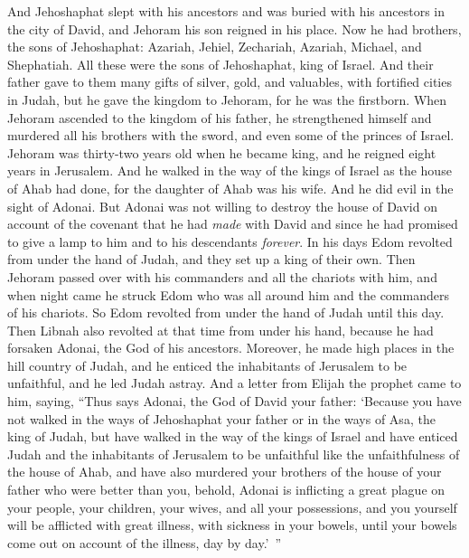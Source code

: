 \begin{biblechapter} %
 And Jehoshaphat slept with his ancestors and was buried with his ancestors in the city of David, and Jehoram his son reigned in his place.
\verse Now he had brothers, the sons of Jehoshaphat: Azariah, Jehiel, Zechariah, Azariah, Michael, and Shephatiah. All these were the sons of Jehoshaphat, king of Israel.
\verse And their father gave to them many gifts of silver, gold, and valuables, with fortified cities in Judah, but he gave the kingdom to Jehoram, for he was the firstborn.
\verse When Jehoram ascended to the kingdom of his father, he strengthened himself and murdered all his brothers with the sword, and even some of the princes of Israel.
\verse Jehoram was thirty-two years old when he became king, and he reigned eight years in Jerusalem.
\verse And he walked in the way of the kings of Israel as the house of Ahab had done, for the daughter of Ahab was his wife. And he did evil in the sight of Adonai.
\verse But Adonai was not willing to destroy the house of David on account of the covenant that he had \textit{made} with David and since he had promised to give a lamp to him and to his descendants \textit{forever}.
\verse In his days Edom revolted from under the hand of Judah, and they set up a king of their own.
\verse Then Jehoram passed over with his commanders and all the chariots with him, and when night came he struck Edom who was all around him and the commanders of his chariots.
\verse So Edom revolted from under the hand of Judah until this day. Then Libnah also revolted at that time from under his hand, because he had forsaken Adonai, the God of his ancestors.
\verse Moreover, he made high places in the hill country of Judah, and he enticed the inhabitants of Jerusalem to be unfaithful, and he led Judah astray.
\verse And a letter from Elijah the prophet came to him, saying, “Thus says Adonai, the God of David your father: ‘Because you have not walked in the ways of Jehoshaphat your father or in the ways of Asa, the king of Judah,
\verse but have walked in the way of the kings of Israel and have enticed Judah and the inhabitants of Jerusalem to be unfaithful like the unfaithfulness of the house of Ahab, and have also murdered your brothers of the house of your father who were better than you,
\verse behold, Adonai is inflicting a great plague on your people, your children, your wives, and all your possessions,
\verse and you yourself will be afflicted with great illness, with sickness in your bowels, until your bowels come out on account of the illness, day by day.’ ”

\end{biblechapter}

